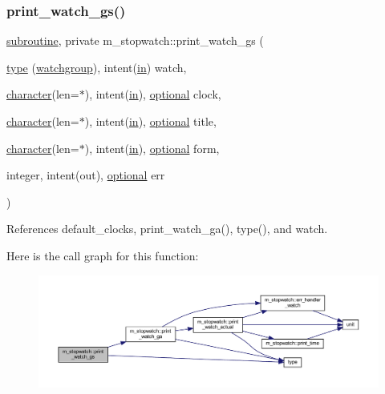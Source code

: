 \subsubsection{\texorpdfstring{print\+\_\+watch\+\_\+gs()}{print\_watch\_gs()}}
{\footnotesize\ttfamily \hyperlink{M__stopwatch_83_8txt_acfbcff50169d691ff02d4a123ed70482}{subroutine}, private m\+\_\+stopwatch\+::print\+\_\+watch\+\_\+gs (\begin{DoxyParamCaption}\item[{\hyperlink{stop__watch_83_8txt_a70f0ead91c32e25323c03265aa302c1c}{type} (\hyperlink{structm__stopwatch_1_1watchgroup}{watchgroup}), intent(\hyperlink{M__journal_83_8txt_afce72651d1eed785a2132bee863b2f38}{in})}]{watch,  }\item[{\hyperlink{option__stopwatch_83_8txt_abd4b21fbbd175834027b5224bfe97e66}{character}(len=$\ast$), intent(\hyperlink{M__journal_83_8txt_afce72651d1eed785a2132bee863b2f38}{in}), \hyperlink{option__stopwatch_83_8txt_aa4ece75e7acf58a4843f70fe18c3ade5}{optional}}]{clock,  }\item[{\hyperlink{option__stopwatch_83_8txt_abd4b21fbbd175834027b5224bfe97e66}{character}(len=$\ast$), intent(\hyperlink{M__journal_83_8txt_afce72651d1eed785a2132bee863b2f38}{in}), \hyperlink{option__stopwatch_83_8txt_aa4ece75e7acf58a4843f70fe18c3ade5}{optional}}]{title,  }\item[{\hyperlink{option__stopwatch_83_8txt_abd4b21fbbd175834027b5224bfe97e66}{character}(len=$\ast$), intent(\hyperlink{M__journal_83_8txt_afce72651d1eed785a2132bee863b2f38}{in}), \hyperlink{option__stopwatch_83_8txt_aa4ece75e7acf58a4843f70fe18c3ade5}{optional}}]{form,  }\item[{integer, intent(out), \hyperlink{option__stopwatch_83_8txt_aa4ece75e7acf58a4843f70fe18c3ade5}{optional}}]{err }\end{DoxyParamCaption})\hspace{0.3cm}{\ttfamily [private]}}



References default\+\_\+clocks, print\+\_\+watch\+\_\+ga(), type(), and watch.

Here is the call graph for this function\+:
\nopagebreak
\begin{figure}[H]
\begin{center}
\leavevmode
\includegraphics[width=350pt]{namespacem__stopwatch_ab397616c3f1dfa3c10e4587356de3d70_cgraph}
\end{center}
\end{figure}
\mbox{\label{namespacem__stopwatch_aa4b391b6d6f238d60db1630ff32f4a33}} 
